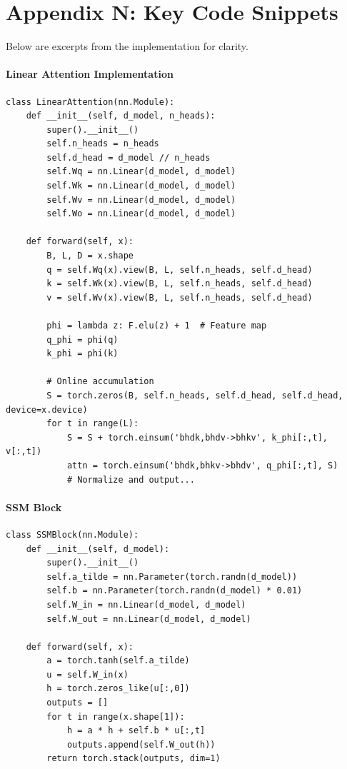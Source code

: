 \documentclass{article}
\begin{document}
\section{Appendix N: Key Code Snippets}
Below are excerpts from the implementation for clarity.

\paragraph{Linear Attention Implementation}
\begin{verbatim}
class LinearAttention(nn.Module):
    def __init__(self, d_model, n_heads):
        super().__init__()
        self.n_heads = n_heads
        self.d_head = d_model // n_heads
        self.Wq = nn.Linear(d_model, d_model)
        self.Wk = nn.Linear(d_model, d_model)
        self.Wv = nn.Linear(d_model, d_model)
        self.Wo = nn.Linear(d_model, d_model)

    def forward(self, x):
        B, L, D = x.shape
        q = self.Wq(x).view(B, L, self.n_heads, self.d_head)
        k = self.Wk(x).view(B, L, self.n_heads, self.d_head)
        v = self.Wv(x).view(B, L, self.n_heads, self.d_head)
        
        phi = lambda z: F.elu(z) + 1  # Feature map
        q_phi = phi(q)
        k_phi = phi(k)
        
        # Online accumulation
        S = torch.zeros(B, self.n_heads, self.d_head, self.d_head, device=x.device)
        for t in range(L):
            S = S + torch.einsum('bhdk,bhdv->bhkv', k_phi[:,t], v[:,t])
            attn = torch.einsum('bhdk,bhkv->bhdv', q_phi[:,t], S)
            # Normalize and output...
\end{verbatim}

\paragraph{SSM Block}
\begin{verbatim}
class SSMBlock(nn.Module):
    def __init__(self, d_model):
        super().__init__()
        self.a_tilde = nn.Parameter(torch.randn(d_model))
        self.b = nn.Parameter(torch.randn(d_model) * 0.01)
        self.W_in = nn.Linear(d_model, d_model)
        self.W_out = nn.Linear(d_model, d_model)

    def forward(self, x):
        a = torch.tanh(self.a_tilde)
        u = self.W_in(x)
        h = torch.zeros_like(u[:,0])
        outputs = []
        for t in range(x.shape[1]):
            h = a * h + self.b * u[:,t]
            outputs.append(self.W_out(h))
        return torch.stack(outputs, dim=1)
\end{verbatim}
\end{document}
